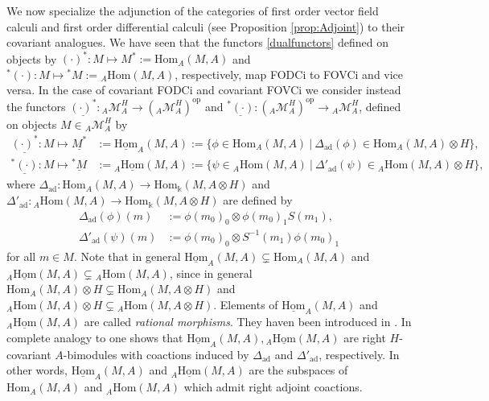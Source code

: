 \documentclass{article}
\theoremstyle{definition}
\begin{document}
	We now specialize the adjunction of the categories of first order vector field calculi and first order differential calculi (see Proposition \ref{prop:Adjoint}) to their covariant analogues. We have seen that the functors \eqref{dualfunctors} defined on objects by $(\cdot)^*\colon M\mapsto M^*:=\mathrm{Hom}_A(M,A)$ and ${}^*(\cdot)\colon M\mapsto{}^*M:={}_A\mathrm{Hom}(M,A)$, respectively, map FODCi to FOVCi and vice versa. In the case of covariant FODCi and covariant FOVCi we consider instead the functors $\underline{(\cdot)^*}\colon{}_A\mathcal{M}_A^H\to({}_A\mathcal{M}_A^H)^\mathrm{op}$ and $\underline{{}^*(\cdot)}\colon({}_A\mathcal{M}_A^H)^\mathrm{op}\to{}_A\mathcal{M}_A^H$, defined on objects $M\in{}_A\mathcal{M}_A^H$ by
	\begin{equation}\label{rationalmorh}
		\begin{split}
			\underline{(\cdot)^*}\colon M\mapsto\underline{M^*}&:=\underline{\mathrm{Hom}}_A(M,A)
			:=\{\phi\in\mathrm{Hom}_A(M,A)~|~\Delta_\mathrm{ad}(\phi)\in\mathrm{Hom}_A(M,A)\otimes H\},\\
			\underline{{}^*(\cdot)}\colon M\mapsto\underline{{}^*M}&:={}_A\underline{\mathrm{Hom}}(M,A):=\{\psi\in{}_A\mathrm{Hom}(M,A)~|~\Delta'_\mathrm{ad}(\psi)\in{}_A\mathrm{Hom}(M,A)\otimes H\},  
		\end{split}
	\end{equation}
	where $\Delta_\mathrm{ad}\colon\mathrm{Hom}_A(M,A)\to\mathrm{Hom}_\Bbbk(M,A\otimes H)$ and $\Delta'_\mathrm{ad}\colon{}_A\mathrm{Hom}(M,A)\to\mathrm{Hom}_\Bbbk(M,A\otimes H)$ are defined by
	\begin{equation}
		\begin{split}
			\Delta_\mathrm{ad}(\phi)(m)&:=\phi(m_0)_0\otimes\phi(m_0)_1S(m_1),\\
			\Delta'_\mathrm{ad}(\psi)(m)&:=\phi(m_0)_0\otimes S^{-1}(m_1)\phi(m_0)_1
		\end{split}
	\end{equation}
	for all $m\in M$. Note that in general $\underline{\mathrm{Hom}}_A(M,A)\subsetneq\mathrm{Hom}_A(M,A)$ and ${}_A\underline{\mathrm{Hom}}(M,A)\subsetneq{}_A\mathrm{Hom}(M,A)$, since in general $\mathrm{Hom}_A(M,A)\otimes H\subsetneq\mathrm{Hom}_A(M,A\otimes H)$ and ${}_A\mathrm{Hom}(M,A)\otimes H\subsetneq{}_A\mathrm{Hom}(M,A\otimes H)$. 
	Elements of $\underline{\mathrm{Hom}}_A(M,A)$ and ${}_A\underline{\mathrm{Hom}}(M,A)$ are called \textit{rational morphisms}. They haven been introduced in \cite{Ulbrich,Caenepeel}. In complete analogy to \cite[Section 2.2]{PaoloThomas} one shows that $\underline{\mathrm{Hom}}_A(M,A),{}_A\underline{\mathrm{Hom}}(M,A)$ are right $H$-covariant $A$-bimodules with coactions induced by $\Delta_\mathrm{ad}$ and $\Delta'_\mathrm{ad}$, respectively. In other words, $\underline{\mathrm{Hom}}_A(M,A)$ and ${}_A\underline{\mathrm{Hom}}(M,A)$ are the subspaces of $\mathrm{Hom}_A(M,A)$ and ${}_A\mathrm{Hom}(M,A)$ which admit right adjoint coactions. 
\end{document}
